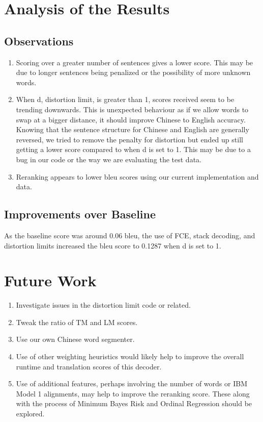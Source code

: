 \documentclass[letterpaper]{article}
\begin{document}
\section{Analysis of the Results}

\subsection{Observations}

\begin{enumerate}
    \item Scoring over a greater number of sentences gives a lower score. This may be due to longer sentences being penalized or the possibility of more unknown words.
    \item When d, distortion limit, is greater than 1, scores received seem to be trending downwards. This is unexpected behaviour as if we allow words to swap at a bigger distance, it should improve Chinese to English accuracy. Knowing that the sentence structure for Chinese and English are generally reversed, we tried to remove the penalty for distortion but ended up still getting a lower score compared to when d is set to 1. This may be due to a bug in our code or the way we are evaluating the test data.
    \item Reranking appears to lower bleu scores using our current implementation and data.
\end{enumerate}

\subsection{Improvements over Baseline}

\indent \indent As the baseline score was around 0.06 bleu, the use of FCE, stack decoding, and distortion limits increased the bleu score to 0.1287 when d is set to 1.

\section{Future Work}
\begin{enumerate}
    \item Investigate issues in the distortion limit code or related.
    \item Tweak the ratio of TM and LM scores.
    \item Use our own Chinese word segmenter.
    \item Use of other weighting heuristics would likely help to improve the overall runtime and translation scores of this decoder.
    \item Use of additional features, perhaps involving the number of words or IBM Model 1 alignments, may help to improve the reranking score. These along with the process of Minimum Bayes Risk and Ordinal Regression should be explored.
\end{enumerate}
\newpage
\end{document}
